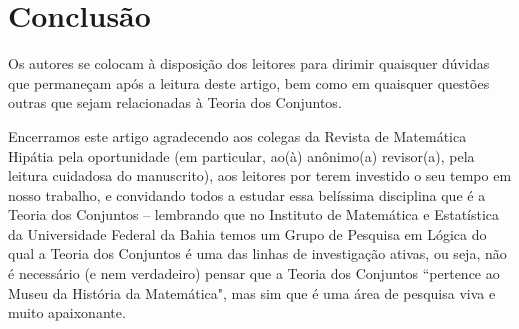 \documentclass{hipatia}
\begin{document}
\begin{itemize}




\end{itemize}

\section{Conclusão}

Os autores se colocam à disposição dos
leitores para dirimir quaisquer dúvidas que
permaneçam após a leitura deste artigo, bem
como em quaisquer questões outras que sejam
relacionadas à Teoria dos Conjuntos. 

Encerramos este artigo agradecendo aos colegas
da Revista de Matemática Hipátia pela
oportunidade (em particular, ao(\`a) anônimo(a) revisor(a), pela leitura cuidadosa do 
manuscrito), aos leitores por terem investido
o seu tempo em nosso trabalho, e convidando
todos a estudar essa belíssima disciplina que
é a Teoria dos Conjuntos -- lembrando que no
Instituto de Matemática e Estatística da
Universidade Federal da Bahia temos um Grupo
de Pesquisa em Lógica do qual a Teoria dos
Conjuntos é uma das linhas de investigação
ativas, ou  seja, não é necessário (e nem
verdadeiro) pensar que a Teoria dos Conjuntos
``pertence ao Museu da História da
Matemática", mas sim que é uma área de
pesquisa viva e muito apaixonante.
\end{document}
